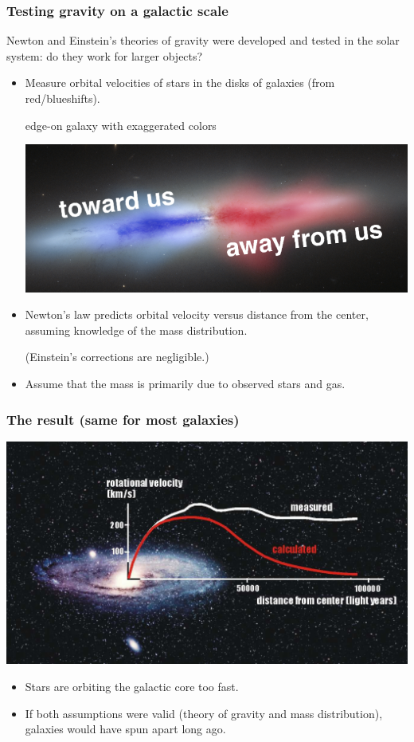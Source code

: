 \documentclass[compress]{beamer}
\begin{document}
\begin{frame}
\frametitle{Testing gravity on a galactic scale}

Newton and Einstein's theories of gravity were developed and tested in
the solar system: do they work for larger objects?

\begin{itemize}
\item Measure orbital velocities of stars in the disks of galaxies (from red/blueshifts).

\begin{center}
edge-on galaxy with exaggerated colors

\includegraphics[width=0.6\linewidth]{pictures/toward_away.png}
\end{center}

\item Newton's law predicts orbital velocity versus distance from the
  center, assuming knowledge of the mass distribution.

(Einstein's corrections are negligible.)

\item Assume that the mass is primarily due to observed stars and gas.
\end{itemize}
\end{frame}

\begin{frame}
\frametitle{The result (same for most galaxies)}
\includegraphics[width=\linewidth]{pictures/galaxy_rotation_curve.jpg}

\begin{itemize}
\item Stars are orbiting the galactic core too fast.
\item If both assumptions were valid (theory of gravity and mass
  distribution), galaxies would have spun
  apart long ago.
\end{itemize}
\end{frame}
\end{document}
